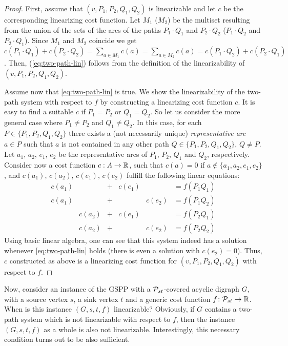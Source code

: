 \begin{proof}
    First, assume that $(v,P_1,P_2,Q_1,Q_2)$ is linearizable and let $c$ be the corresponding  linearizing cost function.  Let $M_1$ ($M_2$) be the multiset  resulting from   the union of the sets of the arcs of the paths $P_1\cdot Q_1$ and $P_2\cdot Q_2$  ($P_1\cdot Q_2$ and $P_2 \cdot Q_1$). Since $M_1$ and $M_2$ coincide we get   $c(P_1 \cdot Q_1) + c(P_2 \cdot Q_2) =\sum_{a\in M_1} c(a)= \sum_{a\in M_2} c(a)=c(P_1 \cdot Q_2) + c(P_2 \cdot Q_1)$. Then,   (\ref{eq:two-path-lin}) follows from the definition of the linearizability of   $(v,P_1,P_2,Q_1,Q_2)$.
    
    Assume now  that \cref{eq:two-path-lin} is true. We  show the linearizability of  the two-path system with respect to $f$ by constructing a linearizing cost function $c$.   It is easy to find a suitable  $c$ if $P_1=P_2$ or $Q_1=Q_2$. So let us consider  the more general case  where $P_1\neq P_2$ and $Q_1\neq Q_2$.  In this case, for   each  $P\in \{P_1,P_2,Q_1,Q_2\}$ there exists a (not necessarily unique) \emph{representative arc} $a\in P$ such that $a$  is not contained in any other path  $Q\in \{P_1,P_2,Q_1,Q_2\}$, $Q \neq P$. Let $a_1$, $a_2$, $e_1$, $e_2$ be the representative arcs of $P_1$, $P_2$, $Q_1$ and $Q_2$, respectively.  Consider now a cost function $c : A \rightarrow \mathbb{R}$, such that $c(a) = 0$ if  $a\not\in \{a_1, a_2, e_1, e_2\}$, and $c(a_1)$, $c(a_2)$, $c(e_1)$, 
$c(e_2)$ fulfill the following linear equations:
    \begin{equation*}
        \begin{array}{llcllcl}
        c(a_1) & & + & c(e_1) & & = f(P_1Q_1) \\
        c(a_1) & & + & & c(e_2) &= f(P_1Q_2) \\
        &c(a_2) & + & c(e_1) & &= f(P_2Q_1) \\
        &c(a_2) & + & & c(e_2) &= f(P_2Q_2) 
    \end{array}
    \end{equation*}
    Using basic linear algebra, one can see that this system indeed has a solution whenever  \cref{eq:two-path-lin} holds (there is even a solution with $c(e_2) = 0$). Thus, $c$ constructed as above is a linearizing  cost function for $(v,P_1,P_2,Q_1,Q_2)$ with respect to $f$. 
     
\end{proof}

Now, consider an instance of the GSPP with a $\mathcal{P}_{st}$-covered acyclic digraph $G$, with a  source vertex $s$, a sink vertex $t$ and a generic cost function $f\colon \mathcal{P}_{st}\to \mathbb{R}$. When is this instance $(G,s,t,f)$ linearizable? Obviously, if $G$ contains a two-path system which is not linearizable with respect to $f$, then the instance $(G,s,t,f)$ as a whole is also not linearizable. Interestingly, this necessary condition turns out to be also sufficient.

